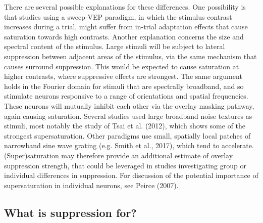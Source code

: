 \documentclass[]{article}
\begin{document}
There are several possible explanations for these differences. One possibility is that studies using a sweep-VEP paradigm, in which the stimulus contrast increases during a trial, might suffer from in-trial adaptation effects that cause saturation towards high contrasts. Another explanation concerns the size and spectral content of the stimulus. Large stimuli will be subject to lateral suppression between adjacent areas of the stimulus, via the same mechanism that causes surround suppression. This would be expected to cause saturation at higher contrasts, where suppressive effects are strongest. The same argument holds in the Fourier domain for stimuli that are spectrally broadband, and so stimulate neurons responsive to a range of orientations and spatial frequencies. These neurons will mutually inhibit each other via the overlay masking pathway, again causing saturation. Several studies used large broadband noise textures as stimuli, most notably the study of Tsai et al. (2012), which shows some of the strongest supersaturation. Other paradigms use small, spatially local patches of narrowband sine wave grating (e.g. Smith et al., 2017), which tend to accelerate. (Super)saturation may therefore provide an additional estimate of overlay suppression strength, that could be leveraged in studies investigating group or individual differences in suppression. For discussion of the potential importance of supersaturation in individual neurons, see Peirce (2007).

\hypertarget{what-is-suppression-for}{%
\subsection{What is suppression for?}\label{what-is-suppression-for}}
\end{document}

